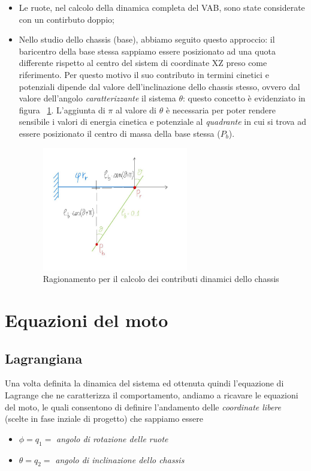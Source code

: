 \begin{itemize}
 	\item Le ruote, nel calcolo della dinamica completa del VAB, sono state considerate con un contirbuto doppio;
 	
 	\item Nello studio dello chassis (base), abbiamo seguito questo approccio: il baricentro della base stessa sappiamo essere posizionato ad una quota differente rispetto al centro del sistem di coordinate XZ preso come riferimento.
 	Per questo motivo il suo contributo in termini cinetici e potenziali dipende dal valore dell'inclinazione dello chassis stesso, ovvero dal valore dell'angolo \textit{caratterizzante} il sistema $\theta$: questo concetto è evidenziato in figura ~\ref{fig:chassis}.
 	L'aggiunta di \textit{$\pi$} al valore di $\theta$ è necessaria per poter rendere sensibile i valori di energia cinetica e potenziale al \textit{quadrante} in cui si trova ad essere posizionato il centro di massa della base stessa ($P_b$).
 	
 	\begin{figure}[h]
 		\centering   	
 		\includegraphics[width=0.6\textwidth]{Immagini/ChassisAngle.jpg}
 		\caption{Ragionamento per il calcolo dei contributi dinamici dello chassis}
 		\label{fig:chassis}
 	\end{figure}
 	
\end{itemize}

\chapter{Equazioni del moto}
\section{Lagrangiana}
Una volta definita la dinamica del sistema ed ottenuta quindi l'equazione di Lagrange che ne caratterizza il comportamento, andiamo a ricavare le equazioni del moto, le quali consentono di definire l'andamento delle \textit{coordinate libere} (scelte in fase inziale di progetto) che sappiamo essere
\begin{itemize}
	\item $\phi = q_1 =$ \textit{angolo di rotazione delle ruote}
	\item $\theta = q_2 =$ \textit{angolo di inclinazione dello chassis}
\end{itemize}

